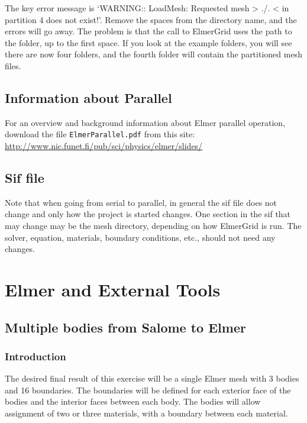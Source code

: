  The key error message is `WARNING:: LoadMesh: Requested mesh > ./. < in partition 4 does not exist!'.  Remove the spaces from the directory name, and the errors will go away.  The problem is that the call to ElmerGrid uses the path to the folder, up to the first space.  If you look at the example folders, you will see there are now four folders, and the fourth folder will contain the partitioned mesh files.


\section{Information about Parallel}

For an overview and background information about Elmer parallel operation, download the file \texttt{ElmerParallel.pdf} from this site:\\

\url{http://www.nic.funet.fi/pub/sci/physics/elmer/slides/}


\section{Sif file}

Note that when going from serial to parallel, in general the sif file does not change and only how the project is started changes.  One section in the sif that may change may be the mesh directory, depending on how ElmerGrid is run.  The solver, equation, materials, boundary conditions, etc., should not need any changes.


\chapter{Elmer and External Tools}

\section{Multiple bodies from Salome to Elmer}

\subsection{Introduction}

The desired final result of this exercise will be a single Elmer mesh with 3 bodies and 16 boundaries.  The boundaries will be defined for each exterior face of the bodies and the interior faces between each body.  The bodies will allow assignment of two or three materials, with a boundary between each material.\\

